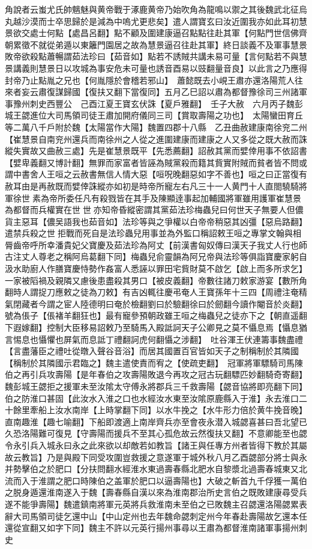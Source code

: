 角說者云蚩尤氏帥魑魅與黄帝戰于涿鹿黄帝乃始吹角為龍鳴以禦之其後魏武北征烏丸越沙漠而士卒思歸於是減為中嗚尤更悲矣】遣人謂寶玄曰汝近圍我亦如此耳初慧景欲交處士何點【處昌呂翻】點不顧及圍建康逼召點點往赴其軍【何點門世信佛齊朝累徵不就從弟遁以東籬門園居之故為慧景逼召往赴其軍】終日談義不及軍事慧景敗帝欲殺點蕭暢謂茹法珍曰【茹音如】點若不誘賊共講未易可量【言何點若不與慧景講義則慧景日以攻城為事安危未可量也誘音酉易以豉翻量音良】以此言之乃應得封帝乃止點胤之兄也【何胤隱於會稽若邪山】　蕭懿既去小峴王肅亦還洛陽荒人往來者妄云肅復謀歸國【復扶又翻下當復同】五月乙巳詔以肅為都督豫徐司三州諸軍事豫州刺史西豐公　己酉江夏王寶玄伏誅【夏戶雅翻】　壬子大赦　六月丙子魏彭城王勰進位大司馬領司徒王肅加開府儀同三司【賞取壽陽之功也】　太陽蠻田育丘等二萬八千戶附於魏【太陽當作大陽】魏置四郡十八縣　乙丑曲赦建康南徐兖二州【崔慧景自南兖州還兵而南徐州之人從之進圍建康而建康之人又多從之既大赦而誅縱失實故又曲赦三處】先是崔慧景既平【先悉薦翻】詔赦其黨而嬖倖用事不依詔書【嬖卑義翻又博計翻】無罪而家富者皆誣為賊黨殺而籍其貲實附賊而貧者皆不問或謂中書舍人王咺之云赦書無信人情大惡【咺呪晚翻惡如字不善也】咺之曰正當復有赦耳由是再赦既而嬖倖誅縱亦如初是時帝所寵左右凡三十一人黄門十人直閤驍騎將軍徐世素為帝所委任凡有殺戮皆在其手及陳顯逹事起加輔國將軍雖用護軍崔慧景為都督而兵權實在世世亦知帝昏縱密謂其黨茹法珍梅蟲兒曰何世天子無要人但儂貨主惡耳【儂吴語我也茹音如】法珍等與之爭權以白帝帝稍惡其凶彊【惡烏路翻】遣禁兵殺之世拒戰而死自是法珍蟲兒用事並為外監口稱詔敕王咺之專掌文翰與相脣齒帝呼所幸潘貴妃父寶慶及茹法珍為阿丈【前漢書匈奴傳曰漢天子我丈人行也師古注丈人尊老之稱阿烏葛翻下同】梅蟲兒俞靈韻為阿兄帝與法珍等俱詣寶慶家躬自汲水助廚人作膳寶慶恃勢作姦富人悉誣以罪田宅貲財莫不啟乞【啟上而多所求乞】一家被䧟禍及親隣又慮後患盡殺其男口【被皮義翻】帝數往諸刀敕家游宴【數所角翻時人謂捉刀應敕之徒為刀敕】有吉凶輒往慶弔奄人王寶孫年十三四【周禮注奄精氣閉藏者今謂之宦人陸德明曰奄於檢翻劉曰於驗翻徐曰於劒翻今讀作閹音於炎翻】號為倀子【倀褚羊翻狂也】最有寵參預朝政雖王咺之梅蟲兒之徒亦下之【朝直遥翻下遐嫁翻】控制大臣移易詔敕乃至騎馬入殿詆訶天子公卿見之莫不懾息焉【懾息猶言惕息也懾懼也屏氣而息詆丁禮翻訶虎何翻懾之涉翻】　吐谷渾王伏連籌事魏盡禮【言盡藩臣之禮吐從暾入聲谷音浴】而居其國置百官皆如天子之制稱制於其隣國【稱制於其隣國示君臨之】魏主遣使責而宥之【使疏吏翻】　冠軍將軍驃騎司馬陳伯之再引兵攻壽陽【是年春伯之攻壽陽敗退今再攻之冠古玩翻驃匹妙翻騎奇寄翻】魏彭城王勰拒之援軍未至汝隂太守傅永將郡兵三千救壽陽【勰音協將即亮翻下同】伯之防淮口甚固【此汝水入淮之口也水經汝水東至汝隂原鹿縣入于淮】永去淮口二十餘里牽船上汝水南岸【上時掌翻下同】以水牛挽之【水牛形力倍於黄牛挽音晚】直南趣淮【趣七喻翻】下船即渡適上南岸齊兵亦至會夜永潜入城勰喜甚曰吾北望已久恐洛陽難可復見【守壽陽而援兵不至其心孤危故云然復扶又翻】不意卿能至也勰令永引兵入城永曰永之此來欲以却敵若如教旨【諸王與任專方州者皆得下教於其屬故云教旨】乃是與殿下同受攻圍豈救援之意遂軍于城外秋八月乙酉勰部分將士與永并勢擊伯之於肥口【分扶問翻水經淮水東過壽春縣北肥水自黎漿北過壽春城東又北流而入于淮謂之肥口時陳伯之盖軍於肥口以逼壽陽也】大破之斬首九千俘獲一萬伯之脱身遁還淮南遂入于魏【壽春縣自漢以來為淮南郡治所史言伯之既敗建康尋受兵遂不能爭壽陽】魏遣鎮南將軍元英將兵救淮南未至伯之已敗魏主召勰還洛陽勰累表辭大司馬領司徒乞還中山【中山定州也去年魏命勰刺定州今年春赴壽陽故乞還本任還從宣翻又如字下同】魏主不許以元英行揚州事尋以王肅為都督淮南諸軍事揚州刺史